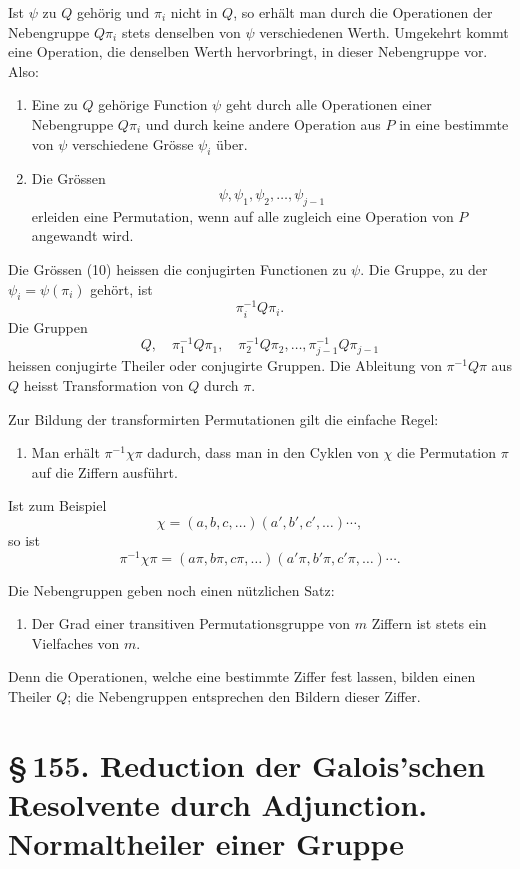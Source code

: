 \documentclass[11pt]{article}
\providecommand{\sect}[2]{\section*{\S\,#1. #2}}
\begin{document}
Ist $\psi$ zu $Q$ gehörig und $\pi_i$ nicht in $Q$, so erhält man durch die Operationen der Nebengruppe $Q\pi_i$ stets denselben von $\psi$ verschiedenen Werth. Umgekehrt kommt eine Operation, die denselben Werth hervorbringt, in dieser Nebengruppe vor. Also:
\begin{enumerate}[label=\arabic*.,leftmargin=2em,start=4]
\item Eine zu $Q$ gehörige Function $\psi$ geht durch alle Operationen einer Nebengruppe $Q\pi_i$ und durch keine andere Operation aus $P$ in eine bestimmte von $\psi$ verschiedene Grösse $\psi_i$ über.
\item Die Grössen
\[
        \psi,
\psi_1,
\psi_2,
\ldots,
\psi_{j-1}
\tag{10}
\]
erleiden eine Permutation, wenn auf alle zugleich eine Operation von $P$ angewandt wird.
\end{enumerate}

Die Grössen (10) heissen die conjugirten Functionen zu $\psi$. Die Gruppe, zu der $\psi_i=\psi(\pi_i)$ gehört, ist
\[
        \pi_i^{-1}Q\pi_i.
\tag{11}
\]
Die Gruppen
\[
        Q,\quad \pi_1^{-1}Q\pi_1,\quad \pi_2^{-1}Q\pi_2,
\ldots,
\pi_{j-1}^{-1}Q\pi_{j-1}
\tag{12}
\]
heissen conjugirte Theiler oder conjugirte Gruppen. Die Ableitung von $\pi^{-1}Q\pi$ aus $Q$ heisst Transformation von $Q$ durch $\pi$.

Zur Bildung der transformirten Permutationen gilt die einfache Regel:
\begin{enumerate}[label=\arabic*.,leftmargin=2em,start=6]
\item Man erhält $\pi^{-1}\chi\pi$ dadurch, dass man in den Cyklen von $\chi$ die Permutation $\pi$ auf die Ziffern ausführt.
\end{enumerate}

Ist zum Beispiel
\[
        \chi=(a,b,c,\ldots)(a',b',c',\ldots)\cdots,
\]
so ist
\[
        \pi^{-1}\chi\pi=(a\pi,b\pi,c\pi,\ldots)(a'\pi,b'\pi,c'\pi,
\ldots)\cdots.
\]

Die Nebengruppen geben noch einen nützlichen Satz:
\begin{enumerate}[label=\arabic*.,leftmargin=2em,start=7]
\item Der Grad einer transitiven Permutationsgruppe von $m$ Ziffern ist stets ein Vielfaches von $m$.
\end{enumerate}
Denn die Operationen, welche eine bestimmte Ziffer fest lassen, bilden einen Theiler $Q$; die Nebengruppen entsprechen den Bildern dieser Ziffer.

\sect{155}{Reduction der Galois'schen Resolvente durch Adjunction. Normaltheiler einer Gruppe}
\end{document}
